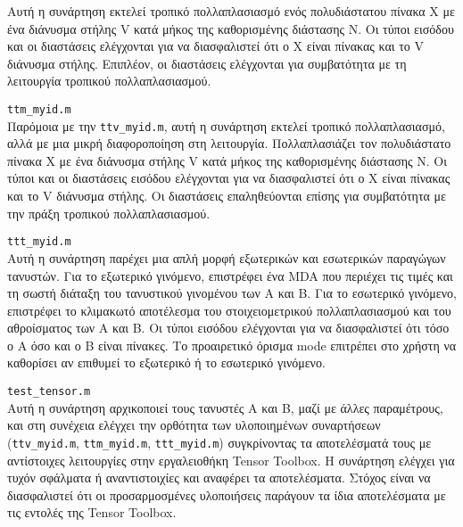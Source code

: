 \documentclass[12pt,a4paper]{article}
\begin{document}
Αυτή η συνάρτηση εκτελεί τροπικό πολλαπλασιασμό ενός πολυδιάστατου πίνακα X με ένα διάνυσμα στήλης V  κατά μήκος της καθορισμένης διάστασης N. Οι τύποι εισόδου και οι διαστάσεις ελέγχονται για να διασφαλιστεί ότι ο  X  είναι πίνακας και το V  διάνυσμα στήλης. Επιπλέον, οι διαστάσεις ελέγχονται για συμβατότητα με τη λειτουργία τροπικού πολλαπλασιασμού.\\

\texttt{ttm\_myid.m} \\

Παρόμοια με την \texttt{ttv\_myid.m}, αυτή η συνάρτηση εκτελεί τροπικό πολλαπλασιασμό, αλλά με μια μικρή διαφοροποίηση στη λειτουργία. Πολλαπλασιάζει τον πολυδιάστατο πίνακα X  με ένα διάνυσμα στήλης V κατά μήκος της καθορισμένης διάστασης N. Οι τύποι και οι διαστάσεις εισόδου ελέγχονται για να διασφαλιστεί ότι ο X είναι πίνακας και το V διάνυσμα στήλης. Οι διαστάσεις επαληθεύονται επίσης για συμβατότητα με την πράξη τροπικού πολλαπλασιασμού.\\

\texttt{ttt\_myid.m} \\

Αυτή η συνάρτηση παρέχει μια απλή μορφή εξωτερικών και εσωτερικών παραγώγων τανυστών. Για το εξωτερικό γινόμενο, επιστρέφει ένα  MDA που περιέχει τις τιμές και τη σωστή διάταξη του τανυστικού γινομένου των A και B. Για το εσωτερικό γινόμενο, επιστρέφει το κλιμακωτό αποτέλεσμα του στοιχειομετρικού πολλαπλασιασμού και του αθροίσματος των A και B. Οι τύποι εισόδου ελέγχονται για να διασφαλιστεί ότι τόσο ο A όσο και ο B είναι πίνακες. Το προαιρετικό όρισμα mode επιτρέπει στο χρήστη να καθορίσει αν επιθυμεί το εξωτερικό ή το εσωτερικό γινόμενο.\\

\texttt{test\_tensor.m} \\

Αυτή η συνάρτηση αρχικοποιεί τους τανυστές A και B, μαζί με άλλες παραμέτρους, και στη συνέχεια ελέγχει την ορθότητα των υλοποιημένων συναρτήσεων (\texttt{ttv\_myid.m}, \texttt{ttm\_myid.m}, \texttt{ttt\_myid.m}) συγκρίνοντας τα αποτελέσματά τους με αντίστοιχες λειτουργίες στην εργαλειοθήκη Tensor Toolbox. H συνάρτηση ελέγχει για τυχόν σφάλματα ή αναντιστοιχίες και αναφέρει τα αποτελέσματα. Στόχος είναι να διασφαλιστεί ότι οι προσαρμοσμένες υλοποιήσεις παράγουν τα ίδια αποτελέσματα με τις εντολές της Tensor Toolbox.
\end{document}
